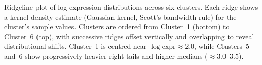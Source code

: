 \caption{Ridgeline plot of log expression distributions across six clusters. Each ridge shows a kernel density estimate (Gaussian kernel, Scott's bandwidth rule) for the cluster's sample values. Clusters are ordered from Cluster~1 (bottom) to Cluster~6 (top), with successive ridges offset vertically and overlapping to reveal distributional shifts. Cluster~1 is centred near $\log\text{expr}\approx2.0$, while Clusters~5 and~6 show progressively heavier right tails and higher medians ($\approx3.0$--$3.5$).}
